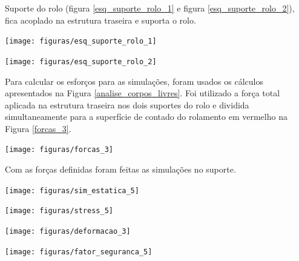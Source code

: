Suporte do rolo (figura \ref{esq_suporte_rolo_1} e figura \ref{esq_suporte_rolo_2}), fica acoplado na estrutura traseira e suporta o rolo.

    \begin{center}
    	\texttt{[image: figuras/esq\_suporte\_rolo\_1]}
        \label{esq_suporte_rolo_1}
    \end{center}

    \begin{center}
    	\texttt{[image: figuras/esq\_suporte\_rolo\_2]}
        \label{esq_suporte_rolo_2}
    \end{center}

Para calcular os esforços para as simulações, foram usados os cálculos apresentados na Figura \ref{analise_corpos_livres}.  Foi utilizado a força total aplicada na estrutura traseira nos dois suportes do rolo e dividida simultaneamente para a superfície de contado do rolamento em vermelho na Figura \ref{forcas_3}.

    \begin{center}
    	\texttt{[image: figuras/forcas\_3]}
        \label{forcas_3}
    \end{center}

Com as forças definidas foram feitas as simulações no suporte.
    \begin{center}
    	\texttt{[image: figuras/sim\_estatica\_5]}
        \label{sim_estatica_5}
    \end{center}

     \begin{center}
    	\texttt{[image: figuras/stress\_5]}
        \label{stress_5}
    \end{center}

    \begin{center}
    	\texttt{[image: figuras/deformacao\_3]}
        \label{deformacao_3}
    \end{center}

     \begin{center}
    	\texttt{[image: figuras/fator\_seguranca\_5]}
        \label{fator_seguranca_5}
    \end{center}

